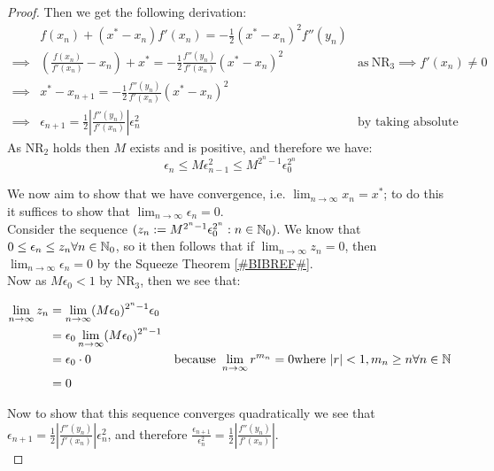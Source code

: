 \begin{Uniform Convergence Thm}
\begin{proof}
Then we get the following derivation:
\begin{displaymath}
\begin{align*}
	&f(x_n) + (x^\ast - x_n)f'(x_n) = 
		-\frac{1}{2}(x^\ast - x_n)^2f''(y_n)\\
	\implies &(\frac{f(x_n)}{f'(x_n)} - x_n) + x^\ast =
		-\frac{1}{2}\frac{f''(y_n)}{f'(x_n)}(x^\ast - x_n)^2
		&\textrm{as} \ \textrm{NR}_3 \implies f'(x_n) \neq 0\\
	\implies &x^\ast - x_{n+1} = 
		-\frac{1}{2}\frac{f''(y_n)}{f'(x_n)}(x^\ast - x_n)^2\\
	\implies &\epsilon_{n+1} =
		\frac{1}{2}\left|\frac{f''(y_n)}{f'(x_n)}\right|\epsilon_n^2
		&\textrm{by taking absolute values}
\end{align*}
\end{displaymath}
As \(\textrm{NR}_2\) holds then \(M\) exists and is positive, and therefore we have:
\[\epsilon_n \le M\epsilon_{n-1}^2 \le M^{2^n - 1}\epsilon_0^{2^n}\]

We now aim to show that we have convergence, i.e. \(\lim_{n \to \infty} x_n = x^\ast\); to do this it suffices to show that \(\lim_{n\to\infty}\epsilon_n = 0\).\\

Consider the sequence \((z_n := M^{2^n - 1}\epsilon_0^{2^n} : n \in \mathbb{N}_0)\). We know that \(0 \le \epsilon_n \le z_n \forall n \in \mathbb{N}_0\), so it then follows that if \(\lim_{n \to \infty}z_n = 0\), then \(\lim_{n \to \infty}\epsilon_n = 0\) by the Squeeze Theorem \ref{#BIBREF#}.\\

Now as \(M\epsilon_0 < 1\) by \(\textrm{NR}_3\), then we see that:

\begin{displaymath}
\begin{align*}
\lim_{n\to\infty}z_n 
	&= \lim_{n\to\infty}(M\epsilon_0)^{2^n - 1}\epsilon_0\\ 
	&= \epsilon_0\lim_{n\to\infty}(M\epsilon_0)^{2^n - 1}\\
	&= \epsilon_0\cdot0
		&\textrm{because } \lim_{n\to\infty}r^{m_n} = 0 \textrm{where }
			|r| < 1, m_n \ge n \forall n \in \mathbb{N}\\
	&= 0
\end{align*}
\end{displaymath}

Now to show that this sequence converges quadratically we see that \(\epsilon_{n+1} = \frac{1}{2}\left|\frac{f''(y_n)}{f'(x_n)}\right|\epsilon_n^2\), and therefore \(\frac{\epsilon_{n+1}}{\epsilon_n^2} = \frac{1}{2}\left|\frac{f''(y_n)}{f'(x_n)}\right|\).\\


\end{proof}
\end{Uniform Convergence Thm}

